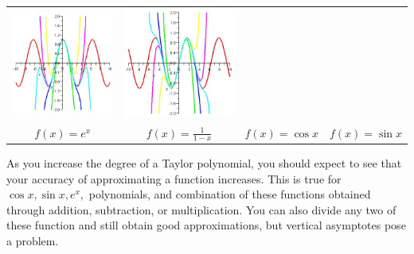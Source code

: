 \begin{center}
\begin{tabular}{cccc}
\includegraphics[width=\mywidth]{08-Power-Series/PowerSeries/taylorc}&
\includegraphics[width=\mywidth]{08-Power-Series/PowerSeries/taylors}
\\
$f(x)=e^x$&
$f(x)=\frac{1}{1-x}$&
$f(x)=\cos x$&
$f(x)=\sin x$
\end{tabular}
\end{center}
As you increase the degree of a Taylor polynomial, you should expect to see that your accuracy of approximating a function increases. This is true for $\cos x, \sin x, e^x,$ polynomials, and combination of these functions obtained through addition, subtraction, or multiplication. You can also divide any two of these function and still obtain good approximations, but vertical asymptotes pose a problem. 

